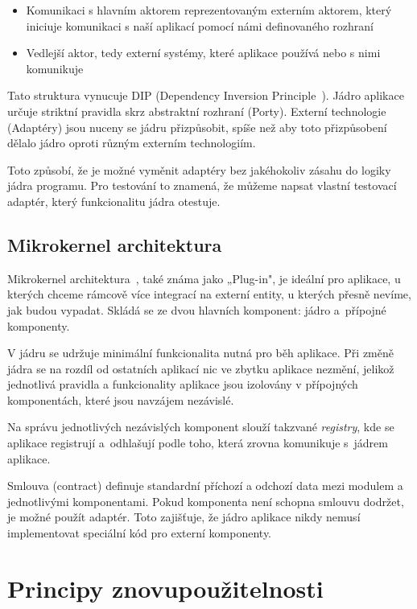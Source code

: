 \begin{itemize}
    \item Komunikaci s hlavním aktorem reprezentovaným externím aktorem, který iniciuje komunikaci s naší aplikací pomocí námi definovaného rozhraní
    \item Vedlejší aktor, tedy externí systémy, které aplikace používá nebo s nimi komunikuje
\end{itemize}

Tato struktura vynucuje DIP (Dependency Inversion Principle~\cite{DIP}). Jádro aplikace určuje striktní pravidla skrz abstraktní rozhraní (Porty). Externí technologie (Adaptéry) jsou nuceny se jádru přizpůsobit, spíše než aby toto přizpůsobení dělalo jádro oproti různým externím technologiím.

Toto způsobí, že je možné vyměnit adaptéry bez jakéhokoliv zásahu do logiky jádra programu. Pro testování to znamená, že můžeme napsat vlastní testovací adaptér, který funkcionalitu jádra otestuje.

\subsection{Mikrokernel architektura}

Mikrokernel architektura~\cite{Microkernel}, také známa jako „Plug-in", je ideální pro aplikace, u kterých chceme rámcově více integrací na externí entity, u kterých přesně nevíme, jak budou vypadat. Skládá se ze dvou hlavních komponent: jádro a~přípojné komponenty. 

V jádru se udržuje minimální funkcionalita nutná pro běh aplikace. Při změně jádra se na rozdíl od ostatních aplikací nic ve zbytku aplikace nezmění, jelikož jednotlivá pravidla a funkcionality aplikace jsou izolovány v přípojných komponentách, které jsou navzájem nezávislé.

Na správu jednotlivých nezávislých komponent slouží takzvané \textit{registry}, kde se aplikace registrují a~odhlašují podle toho, která zrovna komunikuje s~jádrem aplikace.

Smlouva (contract) definuje standardní příchozí a odchozí data mezi modulem a jednotlivými komponentami. Pokud komponenta není schopna smlouvu dodržet, je možné použít adaptér. Toto zajišťuje, že jádro aplikace nikdy nemusí implementovat speciální kód pro externí komponenty.

\section{Principy znovupoužitelnosti}

